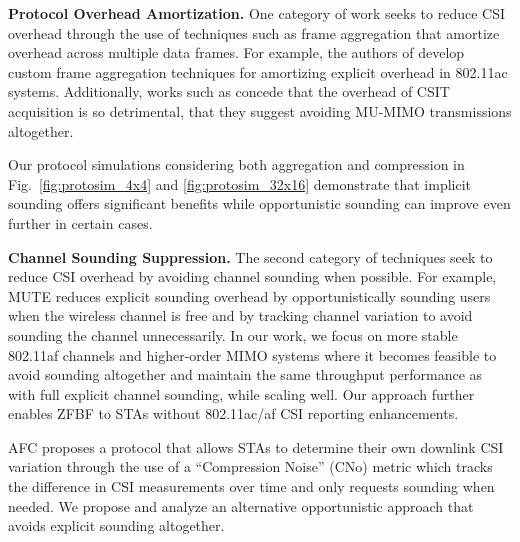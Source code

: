 \textbf{Protocol Overhead Amortization.}
 One category of work seeks to reduce \ac{CSI} overhead through the use of techniques such as frame aggregation that amortize overhead across multiple data frames.
 For example, the authors of  \cite{Bellalta2012} develop custom frame aggregation techniques for amortizing explicit overhead in 802.11ac systems.
 Additionally, works such as \cite{Thapa2012} concede that the overhead of \ac{CSIT} acquisition is so detrimental, that they suggest avoiding \ac{MU-MIMO} transmissions altogether.

 Our protocol simulations considering both aggregation and compression in Fig.~\ref{fig:protosim_4x4} and \ref{fig:protosim_32x16} demonstrate that implicit sounding offers significant benefits while opportunistic sounding can improve even further in certain cases.


\textbf{Channel Sounding Suppression.} 
 The second category of techniques seek to reduce \ac{CSI} overhead by avoiding channel sounding when possible.
 For example, MUTE \cite{bejarano2014mute} reduces explicit sounding overhead by opportunistically sounding users when the wireless channel is free and by tracking channel variation to avoid sounding the channel unnecessarily.
 In our work, we focus on more stable 802.11af channels and higher-order MIMO systems where it becomes feasible to avoid sounding altogether and maintain the same throughput performance as with full explicit channel sounding, while scaling well.
 Our approach further enables \ac{ZFBF} to \acp{STA} without 802.11ac/af \ac{CSI} reporting enhancements.

 AFC \cite{xie2013adaptive} proposes a protocol that allows \acp{STA} to determine their own downlink \ac{CSI} variation through the use of a ``Compression Noise'' (CNo) metric which tracks the difference in \ac{CSI} measurements over time and only requests sounding when needed.
	We propose and analyze an alternative opportunistic approach that avoids explicit sounding altogether.

